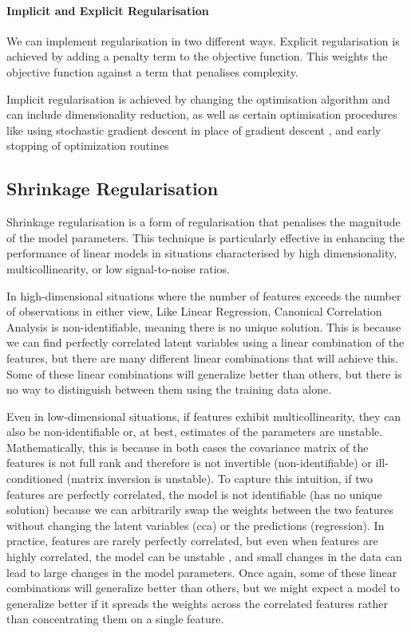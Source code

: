 \paragraph{Implicit and Explicit Regularisation}

We can implement regularisation in two different ways.
Explicit regularisation is achieved by adding a penalty term to the objective function.
This weights the objective function against a term that penalises complexity.

Implicit regularisation is achieved by changing the optimisation algorithm and can include dimensionality reduction, as well as certain optimisation procedures like using stochastic gradient descent in place of gradient descent \citep{ali2020implicit}, and early stopping of optimization routines \citep{yao2007early}

\subsection{Shrinkage Regularisation}

Shrinkage regularisation is a form of regularisation that penalises the magnitude of the model parameters.
This technique is particularly effective in enhancing the performance of linear models in situations characterised by high dimensionality, multicollinearity, or low signal-to-noise ratios.

In high-dimensional situations where the number of features exceeds the number of observations in either view, Like Linear Regression, Canonical Correlation Analysis is non-identifiable, meaning there is no unique solution.
This is because we can find perfectly correlated latent variables using a linear combination of the features, but there are many different linear combinations that will achieve this.
Some of these linear combinations will generalize better than others, but there is no way to distinguish between them using the training data alone.

Even in low-dimensional situations, if features exhibit multicollinearity, they can also be non-identifiable or, at best, estimates of the parameters are unstable.
Mathematically, this is because in both cases the covariance matrix of the features is not full rank and therefore is not invertible (non-identifiable) or ill-conditioned (matrix inversion is unstable).
To capture this intuition, if two features are perfectly correlated, the model is not identifiable (has no unique solution) because we can arbitrarily swap the \gls{weights} between the two features without changing the latent variables (\acrshort{cca}) or the predictions (regression).
In practice, features are rarely perfectly correlated, but even when features are highly correlated, the model can be unstable \citep{mihalik2020multiple}, and small changes in the data can lead to large changes in the model parameters.
Once again, some of these linear combinations will generalize better than others, but we might expect a model to generalize better if it spreads the \gls{weights} across the correlated features rather than concentrating them on a single feature.

